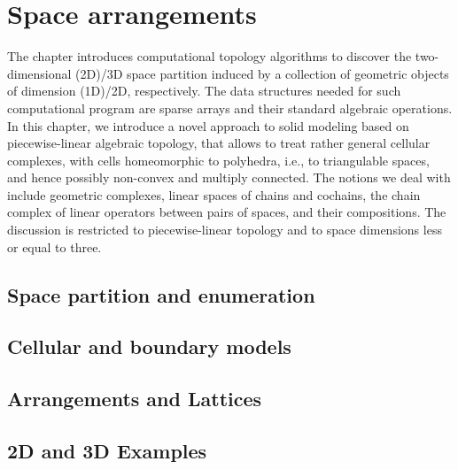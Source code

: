 
\chapter{Space arrangements}
\label{chapt:7}

The chapter introduces computational topology algorithms to discover the two-dimensional (2D)/3D space partition induced by a collection of geometric objects of dimension (1D)/2D, respectively. 
The data structures needed for such computational program are sparse arrays and their standard algebraic operations. In this chapter, we introduce a novel approach to solid modeling based on piecewise-linear algebraic topology, that allows to treat rather general cellular complexes, with cells homeomorphic to polyhedra, i.e., to triangulable spaces, and hence possibly non-convex and multiply connected. The notions we deal with include geometric complexes, linear spaces of chains and cochains, the chain complex of linear operators between pairs of spaces, and their compositions. The discussion is restricted to piecewise-linear topology and to space dimensions less or equal to three. 

\section{ Space partition and enumeration}\label{sect:7-1}


\section{ Cellular and boundary models}\label{sect:7-2}


\section{ Arrangements and Lattices}\label{sect:7-3}


\section{ 2D and 3D Examples}\label{sect:7-4}


